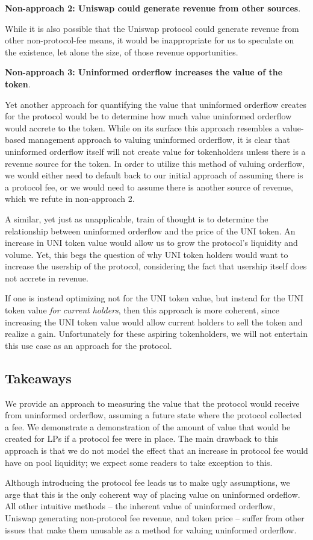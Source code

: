     \textbf{Non-approach 2: Uniswap could generate revenue from other sources}.

    While it is also possible that the Uniswap protocol could generate revenue from other non-protocol-fee means, it would be inappropriate for us to speculate on the existence, let alone the size, of those revenue opportunities.



    \textbf{Non-approach 3: Uninformed orderflow increases the value of the token}.

    Yet another approach for quantifying the value that uninformed orderflow creates for the protocol would be to determine how much value uninformed orderflow would accrete to the token. While on its surface this approach resembles a value-based management approach to valuing uninformed orderflow, it is clear that uninformed orderflow itself will not create value for tokenholders unless there is a revenue source for the token. In order to utilize this method of valuing orderflow, we would either need to default back to our initial approach of assuming there is a protocol fee, or we would need to assume there is another source of revenue, which we refute in non-approach 2.

    A similar, yet just as unapplicable, train of thought is to determine the relationship between uninformed orderflow and the price of the UNI token. An increase in UNI token value would allow us to grow the protocol's liquidity and volume. Yet, this begs the question of why UNI token holders would want to increase the usership of the protocol, considering the fact that usership itself does not accrete in revenue. 

    If one is instead optimizing not for the UNI token value, but instead for the UNI token value \textit{for current holders}, then this approach is more coherent, since increasing the UNI token value would allow current holders to sell the token and realize a gain. Unfortunately for these aspiring tokenholders, we will not entertain this use case as an approach for the protocol.

\subsection{Takeaways}
    We provide an approach to measuring the value that the protocol would receive from uninformed orderflow, assuming a future state where the protocol collected a fee. We demonstrate a demonstration of the amount of value that would be created for LPs if a protocol fee were in place. The main drawback to this approach is that we do not model the effect that an increase in protocol fee would have on pool liquidity; we expect some readers to take exception to this.

    Although introducing the protocol fee leads us to make ugly assumptions, we arge that this is the only coherent way of placing value on uninformed ordeflow. All other intuitive methods -- the inherent value of uninformed orderflow, Uniswap generating non-protocol fee revenue, and token price -- suffer from other issues that make them unusable as a method for valuing uninformed orderflow.
